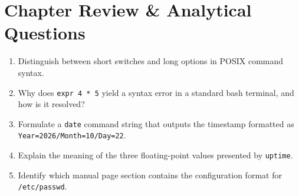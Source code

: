 \section{Chapter Review \& Analytical Questions}
\begin{enumerate}[leftmargin=1.5em]
    \item Distinguish between short switches and long options in POSIX command syntax.
    \item Why does \texttt{expr 4 * 5} yield a syntax error in a standard bash terminal, and how is it resolved?
    \item Formulate a \texttt{date} command string that outputs the timestamp formatted as \texttt{Year=2026/Month=10/Day=22}.
    \item Explain the meaning of the three floating-point values presented by \texttt{uptime}.
    \item Identify which manual page section contains the configuration format for \texttt{/etc/passwd}.
\end{enumerate}
